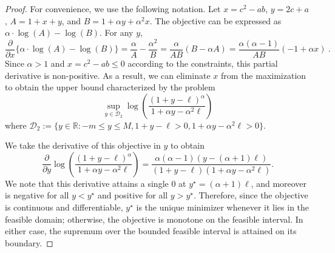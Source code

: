 \documentclass[11pt]{article}
\theoremstyle{definition}
\theoremstyle{plain}
\newcommand{\reals}{\mathbb{R}}
\begin{document}
\begin{proof}
For convenience, we use the following notation.
Let \(x = c^{2} - ab\), \(y = 2c + a\), \(A = 1 + x + y\), and \(B = 1 + \alpha y + \alpha^{2}x\).
The objective can be expressed as \(\alpha \cdot \log(A) - \log (B)\).
For any \(y\), 
\begin{equation*}
    \frac{\partial}{\partial x} \{\alpha \cdot \log(A) - \log(B)\} = \frac{\alpha}{A} - \frac{\alpha^{2}}{B} = \frac{\alpha}{AB}(B - \alpha A) = \frac{\alpha(\alpha - 1)}{AB}(-1 + \alpha x)~.
\end{equation*}
Since \(\alpha > 1\) and \(x = c^{2} - ab \leq 0\) according to the constraints, this partial derivative is non-positive.
As a result, we can eliminate \(x\) from the maximization to obtain the upper bound characterized by the problem
\begin{equation*}
    \sup_{y \in \mathcal{D}_{2}} \log\left(\frac{(1 + y - \ell)^{\alpha}}{1 + \alpha y - \alpha^{2}\ell}\right)
\end{equation*}
where \(\mathcal{D}_{2} := \{y \in \reals : -m \leq y \leq M, 1 + y - \ell > 0, 1 + \alpha y - \alpha^{2}\ell > 0\}\).

We take the derivative of this objective in \(y\) to obtain
\begin{equation}
    \label{eq:first_derivative_div}
    \frac{\partial}{\partial y} \log\left(\frac{(1 + y - \ell)^{\alpha}}{1 + \alpha y - \alpha^{2}\ell}\right) = \frac{\alpha(\alpha - 1) (y - (\alpha + 1) \ell)}{(1 + y - \ell) (1 + \alpha y - \alpha^{2}\ell)}.
\end{equation}
We note that this derivative attains a single \(0\) at \(y^{\star} = (\alpha + 1)\ell\), and moreover is negative for all $y<y^{\star}$ and positive for all $y>y^{\star}$. Therefore, since the objective is continuous and differentiable, $y^{\star}$ is the unique minimizer whenever it lies in the feasible domain; otherwise, the objective is monotone on the feasible interval. In either case, the supremum over the bounded feasible interval is attained on its boundary. 


\end{proof}
\end{document}
